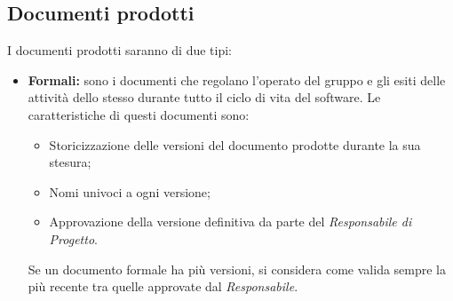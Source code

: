\subsection{Documenti prodotti}
I documenti prodotti saranno di due tipi:
\begin{itemize}
    \item \textbf{Formali:} sono i documenti che regolano l'operato del gruppo e gli esiti delle attività dello stesso durante tutto il ciclo di vita del software.
    Le caratteristiche di questi documenti sono:
    \begin{itemize}
        \item Storicizzazione delle versioni del documento prodotte durante la sua stesura;
        \item Nomi univoci a ogni versione;
        \item Approvazione della versione definitiva da parte del \textit{Responsabile di Progetto}.
    \end{itemize}
    Se un documento formale ha più versioni, si considera come valida sempre la più recente tra quelle approvate dal \textit{Responsabile}.


\end{itemize}
